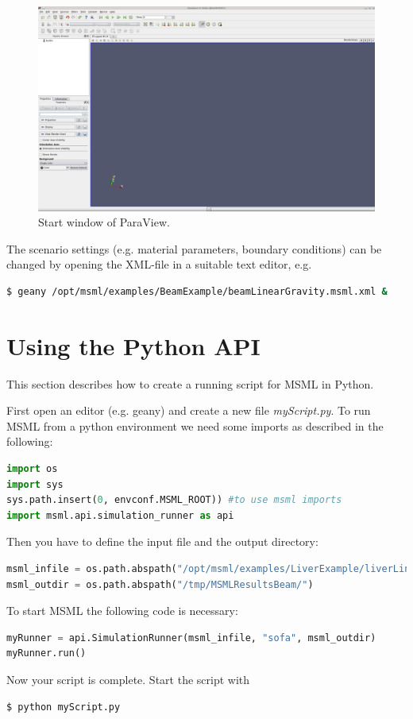 \begin{figure}[h]
  	\centering
    \includegraphics[width=\textwidth]{pictures/start_paraview.png}
    \caption{Start window of ParaView.}
    \label{ParaViewScreenshot}
\end{figure}

The scenario settings (e.g. material parameters, boundary conditions) can be changed by opening the XML-file in a suitable text editor, e.g.
\begin{lstlisting}[language=sh, breaklines=true]
$ geany /opt/msml/examples/BeamExample/beamLinearGravity.msml.xml &
\end{lstlisting}





\section{Using the Python API}

This section describes how to create a running script for MSML in Python.

First open an editor (e.g. geany) and create a new file \emph{myScript.py}.
To run MSML from a python environment we need some imports as described in the following:
\begin{lstlisting}[language=Python]
import os
import sys
sys.path.insert(0, envconf.MSML_ROOT)) #to use msml imports
import msml.api.simulation_runner as api
\end{lstlisting}

Then you have to define the input file and the output directory:
\begin{lstlisting}[language=Python]
msml_infile = os.path.abspath("/opt/msml/examples/LiverExample/liverLinear.msml.xml")
msml_outdir = os.path.abspath("/tmp/MSMLResultsBeam/")
\end{lstlisting}

To start MSML the following code is necessary:
\begin{lstlisting}[language=Python]
myRunner = api.SimulationRunner(msml_infile, "sofa", msml_outdir)
myRunner.run()
\end{lstlisting}

Now your script is complete. Start the script with
\begin{lstlisting}[language=sh, breaklines=true]
$ python myScript.py
\end{lstlisting}
 
